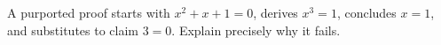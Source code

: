 A purported proof starts with $x^2+x+1=0$, derives $x^3=1$, concludes $x=1$, and substitutes to claim $3=0$. Explain precisely why it fails.
